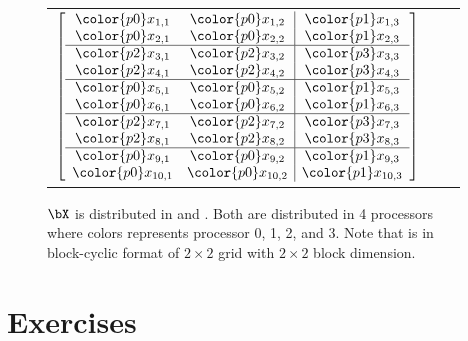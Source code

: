 \begin{figure}
\begin{center}
\begin{tabular}{ccc}
$
\left[
\begin{array}{cc|c}
\color{p0}x_{1,1} & \color{p0}x_{1,2} & \color{p1}x_{1,3} \\
\color{p0}x_{2,1} & \color{p0}x_{2,2} & \color{p1}x_{2,3} \\ \hline
\color{p2}x_{3,1} & \color{p2}x_{3,2} & \color{p3}x_{3,3} \\
\color{p2}x_{4,1} & \color{p2}x_{4,2} & \color{p3}x_{4,3} \\ \hline
\color{p0}x_{5,1} & \color{p0}x_{5,2} & \color{p1}x_{5,3} \\
\color{p0}x_{6,1} & \color{p0}x_{6,2} & \color{p1}x_{6,3} \\ \hline
\color{p2}x_{7,1} & \color{p2}x_{7,2} & \color{p3}x_{7,3} \\
\color{p2}x_{8,1} & \color{p2}x_{8,2} & \color{p3}x_{8,3} \\ \hline
\color{p0}x_{9,1} & \color{p0}x_{9,2} & \color{p1}x_{9,3} \\
\color{p0}x_{10,1} & \color{p0}x_{10,2} & \color{p1}x_{10,3} \\
\end{array}
\right]
$
\end{tabular}
\end{center}
\caption{
$\bX$ is distributed in
 and .
Both are distributed in 4 processors
where colors represents processor {\color{p0}0},
{\color{p1}1}, {\color{p2}2}, and {\color{p3}3}.
Note that  is in block-cyclic format of
$2\times 2$ grid with $2\times 2$ block dimension.
}
\label{fig:spmd_dmat}
\end{figure}



\section{Exercises}
\label{sec:redist_exercise}

